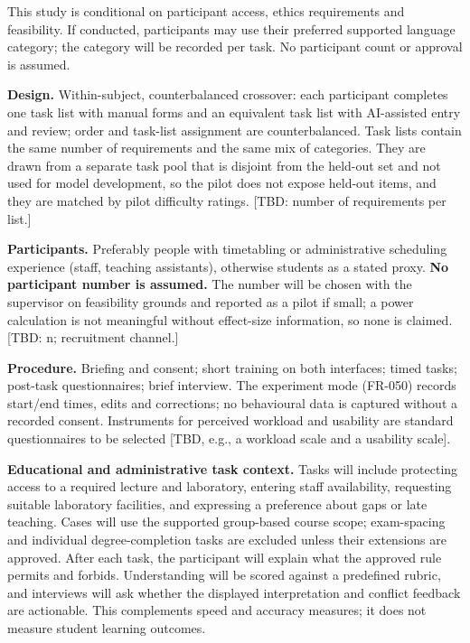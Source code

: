 \documentclass[
  11pt,a4paper,oneside]{report}
\begin{document}
This study is conditional on participant access, ethics requirements and feasibility. If conducted, participants may use their preferred supported language category; the category will be recorded per task. No participant count or approval is assumed.

\textbf{Design.} Within-subject, counterbalanced crossover: each
participant completes one task list with manual forms and an equivalent
task list with AI-assisted entry and review; order and task-list
assignment are counterbalanced. Task lists contain the same number of
requirements and the same mix of categories. They are drawn from a
separate task pool that is disjoint from the held-out set and not used
for model development, so the pilot does not expose held-out items, and
they are matched by pilot difficulty ratings.
{[}TBD: number of requirements per list.{]}

\textbf{Participants.} Preferably people with timetabling or
administrative scheduling experience (staff, teaching assistants),
otherwise students as a stated proxy. \textbf{No participant number is
assumed.} The number will be chosen with the supervisor on feasibility
grounds and reported as a pilot if small; a power calculation is not
meaningful without effect-size information, so none is claimed. {[}TBD:
n; recruitment channel.{]}

\textbf{Procedure.} Briefing and consent; short training on both
interfaces; timed tasks; post-task questionnaires; brief interview. The
experiment mode (FR-050) records start/end times, edits and corrections;
no behavioural data is captured without a recorded consent. Instruments
for perceived workload and usability are standard questionnaires to be
selected {[}TBD, e.g., a workload scale and a usability scale{]}.

\textbf{Educational and administrative task context.} Tasks will include protecting access to a required lecture and laboratory, entering staff availability, requesting suitable laboratory facilities, and expressing a preference about gaps or late teaching. Cases will use the supported group-based course scope; exam-spacing and individual degree-completion tasks are excluded unless their extensions are approved. After each task, the participant will explain what the approved rule permits and forbids. Understanding will be scored against a predefined rubric, and interviews will ask whether the displayed interpretation and conflict feedback are actionable. This complements speed and accuracy measures; it does not measure student learning outcomes.
\end{document}
